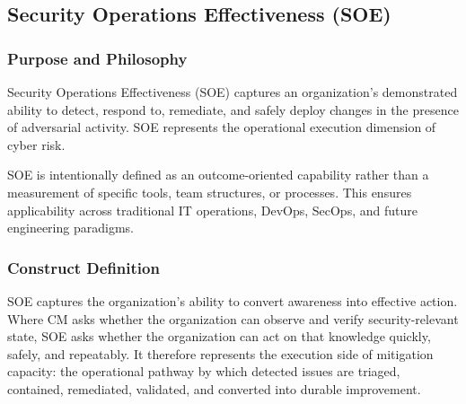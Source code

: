 \documentclass[11pt]{article}
\begin{document}
\subsection{Security Operations Effectiveness (SOE)}
\subsubsection{Purpose and Philosophy}
Security Operations Effectiveness (SOE) captures an organization’s demonstrated
ability to detect, respond to, remediate, and safely deploy changes in the presence of
adversarial activity. SOE represents the operational execution dimension of cyber
risk.

SOE is intentionally defined as an outcome-oriented capability rather than a
measurement of specific tools, team structures, or processes. This ensures
applicability across traditional IT operations, DevOps, SecOps, and future
engineering paradigms.

\subsubsection{Construct Definition}
SOE captures the organization's ability to convert awareness into effective action.
Where CM asks whether the organization can observe and verify security-relevant state,
SOE asks whether the organization can act on that knowledge quickly, safely, and
repeatably. It therefore represents the execution side of mitigation capacity: the
operational pathway by which detected issues are triaged, contained, remediated,
validated, and converted into durable improvement.
\end{document}
